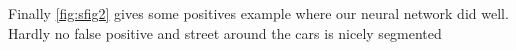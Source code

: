 Finally \ref{fig:sfig2} gives some positives example where our neural network did well. Hardly no false positive and street around the cars is nicely segmented
















%
